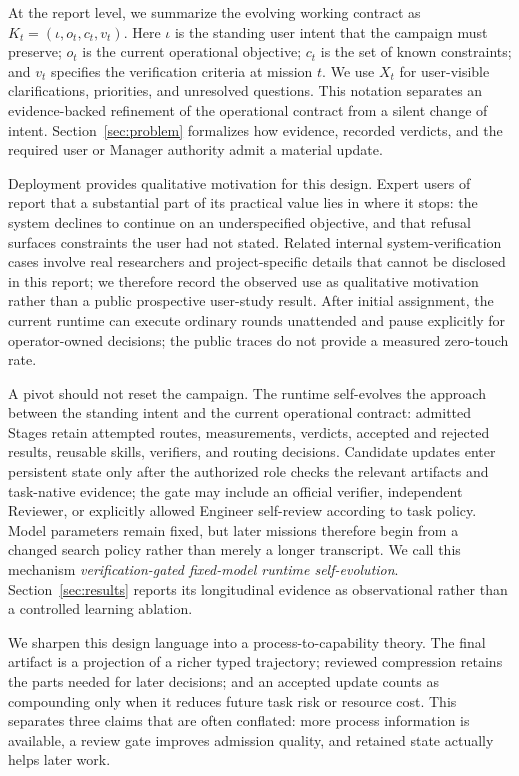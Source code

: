 At the report level, we summarize the evolving working contract as
$K_t=(\iota,o_t,c_t,v_t)$. Here $\iota$ is the standing user intent that the campaign
must preserve; $o_t$ is the current operational objective; $c_t$ is the set of known
constraints; and $v_t$ specifies the verification criteria at mission $t$. We use
$X_t$ for user-visible clarifications, priorities, and unresolved questions. This
notation separates an evidence-backed refinement of the operational contract from a
silent change of intent. Section~\ref{sec:problem} formalizes how evidence, recorded
verdicts, and the required user or Manager authority admit a material update.

Deployment provides qualitative motivation for this design. Expert users of \systemname
report that a substantial part of its practical value lies in where it stops: the
system declines to continue on an underspecified objective, and that refusal surfaces
constraints the user had not stated. Related internal system-verification cases
involve real researchers and project-specific details that cannot be disclosed in
this report; we therefore record the observed use as qualitative motivation rather
than a public prospective user-study result. After initial assignment, the current runtime can execute
ordinary rounds unattended and pause explicitly for operator-owned decisions; the
public traces do not provide a measured zero-touch rate.

A pivot should not reset the campaign. The runtime self-evolves the approach between
the standing intent and the current operational contract: admitted Stages retain
attempted routes, measurements, verdicts, accepted and rejected results, reusable
skills, verifiers, and routing decisions. Candidate updates enter persistent state
only after the authorized role checks the relevant artifacts and task-native evidence;
the gate may include an official verifier, independent Reviewer, or explicitly allowed
Engineer self-review according to task policy. Model parameters remain fixed, but
later missions therefore begin from a changed search policy rather than merely a
longer transcript. We call this mechanism \emph{verification-gated fixed-model runtime
self-evolution}. Section~\ref{sec:results} reports its longitudinal evidence as
observational rather than a controlled learning ablation.

We sharpen this design language into a process-to-capability theory. The final
artifact is a projection of a richer typed trajectory; reviewed compression retains
the parts needed for later decisions; and an accepted update counts as compounding
only when it reduces future task risk or resource cost. This separates three claims
that are often conflated: more process information is available, a review gate
improves admission quality, and retained state actually helps later work.

